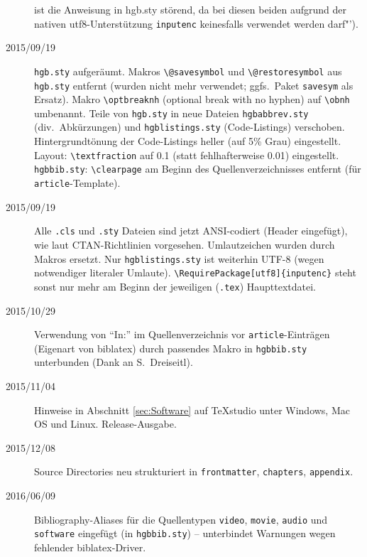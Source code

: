 \begin{sloppypar}
\begin{description}
ist die Anweisung in hgb.sty störend, da bei diesen beiden aufgrund der nativen utf8-Unterstützung 
\texttt{inputenc} keinesfalls verwendet werden darf"').
\item[2015/09/19]
\texttt{hgb.sty} aufgeräumt.
Makros \verb!\@savesymbol! und \verb!\@restoresymbol! aus \texttt{hgb.sty} entfernt
(wurden nicht mehr verwendet; ggfs.\ Paket \texttt{savesym} als Ersatz).
Makro \verb!\optbreaknh! (optional break with no hyphen) auf \verb!\obnh! umbenannt.
Teile von \texttt{hgb.sty} in neue Dateien \texttt{hgbabbrev.sty} (div.\ Abkürzungen)
und \texttt{hgblistings.sty} (Code-Listings) verschoben.
Hintergrundtönung der Code-Listings heller (auf 5\% Grau) eingestellt.
Layout: \verb!\textfraction! auf 0.1 (statt fehlhafterweise 0.01) eingestellt.
\texttt{hgbbib.sty}: \verb!\clearpage! am Beginn des Quellenverzeichnisses entfernt
(für \texttt{article}-Template).
\item[2015/09/19]
Alle \texttt{.cls} und \texttt{.sty} Dateien sind jetzt ANSI-codiert (Header eingefügt), wie
laut CTAN-Richtlinien vorgesehen. Umlautzeichen wurden durch Makros ersetzt.
Nur \texttt{hgblistings.sty} ist weiterhin UTF-8 (wegen notwendiger literaler Umlaute).
\verb!\RequirePackage[utf8]{inputenc}! steht sonst nur mehr am Beginn
der jeweiligen (\texttt{.tex}) Haupttextdatei.
\item[2015/10/29]
Verwendung von "`In:"' im Quellenverzeichnis vor \texttt{article}-Einträgen
(Eigenart von biblatex) durch passendes Makro in \texttt{hgbbib.sty} unterbunden 
(Dank an S.\ Dreiseitl).
\item[2015/11/04]
Hinweise in Abschnitt \ref{sec:Software} auf TeXstudio unter Windows, Mac OS und Linux.
Release-Ausgabe.
\item[2015/12/08]
Source Directories neu strukturiert in \texttt{frontmatter}, \texttt{chapters}, 
\texttt{appendix}.
\item[2016/06/09]
Bibliography-Aliases für die Quellentypen
\texttt{video}, \texttt{movie}, \texttt{audio} und \texttt{software}
eingefügt (in \texttt{hgbbib.sty}) -- unterbindet Warnungen wegen
fehlender biblatex-Driver.
\end{description}
\end{sloppypar}










